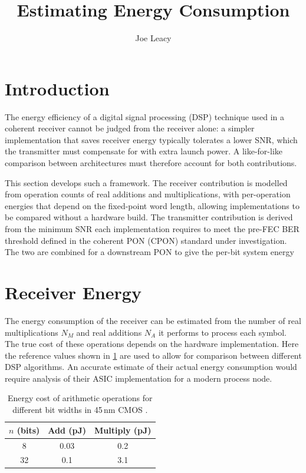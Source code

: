 \documentclass[12pt,a4paper]{article}
\title{Estimating Energy Consumption}
\author{Joe Leacy}
\begin{document}
\maketitle

\section{Introduction}
The energy efficiency of a digital signal processing (DSP) technique used in a coherent receiver cannot be judged from the receiver alone: a simpler implementation that saves receiver energy typically tolerates a lower SNR, which the transmitter must compensate for with extra launch power. A like-for-like comparison between architectures must therefore account for both contributions.

This section develops such a framework. The receiver contribution is modelled from operation counts of real additions and multiplications, with per-operation energies that depend on the fixed-point word length, allowing implementations to be compared without a hardware build. The transmitter contribution is derived from the minimum SNR each implementation requires to meet the pre-FEC BER threshold defined in the coherent PON (CPON) standard \cite{CPON_PMD_2025} under investigation. The two are combined for a downstream PON to give the per-bit system energy


\section{Receiver Energy}
The energy consumption of the receiver can be estimated from the number of real multiplications \(N_M\) and real additions \(N_A\) it performs to process each symbol. The true cost of these operations depends on the hardware implementation. Here the reference values shown in \cref{tab:energy} are used to allow for comparison between different DSP algorithms. An accurate estimate of their actual energy consumption would require analysis of their ASIC implementation for a modern process node.

\begin{table}[H]
    \centering
    \caption{Energy cost of arithmetic operations for different bit widths in 45\,nm CMOS \cite{horowitz2014computing}.}
    \label{tab:energy}
    \begin{tabular}{ccc}
        \toprule
        \(n\) (bits) & Add (pJ) & Multiply (pJ) \\
        \midrule
        8  & 0.03 & 0.2 \\
        32 & 0.1  & 3.1 \\
        \bottomrule
    \end{tabular}
\end{table}
\end{document}
